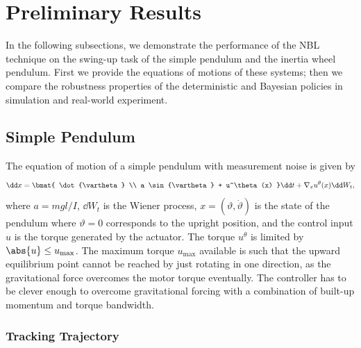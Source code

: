 \chapter{Preliminary Results}
\label{ch:case_study}

In the following subsections, we demonstrate the performance of the NBL
technique on the swing-up task of the simple pendulum and the inertia wheel
pendulum. First we provide the equations of motions of these systems; then we
compare the robustness properties of the deterministic and Bayesian policies in
simulation and real-world experiment.

\section{Simple Pendulum}

The equation of motion of a simple pendulum with measurement noise is given by
%
\begin{equation}
    \dd x = \bmat{
        \dot{\vartheta} \\ 
        a \sin{\vartheta} + u^\theta(x)
    } \dd t+ \nabla_x u^\theta(x) \dd W_t,
    \label{eq:pendulum_sde}
\end{equation}
%
where $a=mgl/I$, $\dd W_t$ is the Wiener process, $x = (\vartheta,
\dot{\vartheta})$ is the state of the pendulum where $\vartheta = 0$ corresponds
to the upright position, and the control input $u$ is the torque generated by
the actuator. 
%
The torque \(u^\theta\) is limited by \(\abs{u} \leq u_{\textrm{max}}\).
%
The maximum torque $u_{\textrm{max}}$ available is such that the upward
equilibrium point cannot be reached by just rotating in one direction, as the
gravitational force overcomes the motor torque eventually. The controller has to
be clever enough to overcome gravitational forcing with a combination of
built-up momentum and torque bandwidth.

\subsection{Tracking Trajectory}

